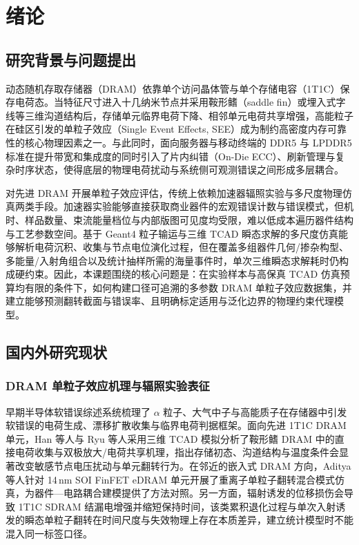 \section{绪论}

\subsection{研究背景与问题提出}
动态随机存取存储器（DRAM）依靠单个访问晶体管与单个存储电容（1T1C）保存电荷态。当特征尺寸进入十几纳米节点并采用鞍形鳍（saddle fin）或埋入式字线等三维沟道结构后，存储单元临界电荷下降、相邻单元电荷共享增强，高能粒子在硅区引发的单粒子效应（Single Event Effects, SEE）成为制约高密度内存可靠性的核心物理因素之一\cite{baumann2005softerrors,han2019saddlefin,ryu2025cryogenicdram}。与此同时，面向服务器与移动终端的 DDR5 与 LPDDR5 标准在提升带宽和集成度的同时引入了片内纠错（On-Die ECC）、刷新管理与复杂时序状态，使得底层的物理电荷扰动与系统侧可观测错误之间形成多层耦合\cite{jedec2020ddr5,jedec2019lpddr5}。

对先进 DRAM 开展单粒子效应评估，传统上依赖加速器辐照实验与多尺度物理仿真两类手段。加速器实验能够直接获取商业器件的宏观错误计数与错误模式，但机时、样品数量、束流能量档位与内部版图可见度均受限，难以低成本遍历器件结构与工艺参数空间\cite{memon2025lpddrprotons,li2025ddr5protons}。基于 Geant4 粒子输运与三维 TCAD 瞬态求解的多尺度仿真能够解析电荷沉积、收集与节点电位演化过程，但在覆盖多组器件几何/掺杂构型、多能量/入射角组合以及统计抽样所需的海量事件时，单次三维瞬态求解耗时仍构成硬约束。因此，本课题围绕的核心问题是：在实验样本与高保真 TCAD 仿真预算均有限的条件下，如何构建口径可追溯的多参数 DRAM 单粒子效应数据集，并建立能够预测翻转截面与错误率、且明确标定适用与泛化边界的物理约束代理模型。

\subsection{国内外研究现状}

\subsubsection{DRAM 单粒子效应机理与辐照实验表征}
早期半导体软错误综述系统梳理了 $\alpha$ 粒子、大气中子与高能质子在存储器中引发软错误的电荷生成、漂移扩散收集与临界电荷判据框架\cite{baumann2005softerrors}。面向先进 1T1C DRAM 单元，Han 等人与 Ryu 等人采用三维 TCAD 模拟分析了鞍形鳍 DRAM 中的直接电荷收集与双极放大/电荷共享机理，指出存储初态、沟道结构与温度条件会显著改变敏感节点电压扰动与单元翻转行为\cite{han2019saddlefin,ryu2025cryogenicdram}。在邻近的嵌入式 DRAM 方向，Aditya 等人针对 14\,nm SOI FinFET eDRAM 单元开展了重离子单粒子翻转混合模式仿真，为器件—电路耦合建模提供了方法对照\cite{aditya2018edram}。另一方面，辐射诱发的位移损伤会导致 1T1C SDRAM 结漏电增强并缩短保持时间\cite{nguyen2018sdramleakage}，该类累积退化过程与单次入射诱发的瞬态单粒子翻转在时间尺度与失效物理上存在本质差异，建立统计模型时不能混入同一标签口径。

